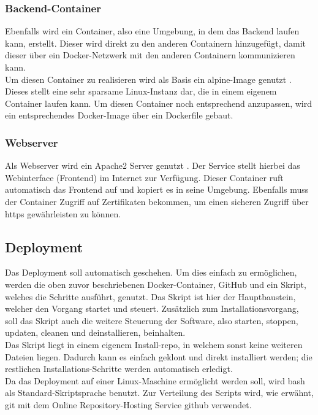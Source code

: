 		\subsubsection{Backend-Container}
		
		Ebenfalls wird ein Container, also eine Umgebung, in dem das Backend laufen kann, erstellt. Dieser wird direkt zu den anderen Containern hinzugefügt, damit dieser über ein Docker-Netzwerk mit den anderen Containern kommunizieren kann.~\\
		Um diesen Container zu realisieren wird als Basis ein alpine-Image genutzt \cite{alpine}. Dieses stellt eine sehr sparsame Linux-Instanz dar, die in einem eigenem Container laufen kann. Um diesen Container noch entsprechend anzupassen, wird ein entsprechendes Docker-Image über ein Dockerfile gebaut.
		
		\subsubsection{Webserver}
		
		Als Webserver wird ein Apache2 Server genutzt \cite{apache}. Der Service stellt hierbei das Webinterface (Frontend) im Internet zur Verfügung. Dieser Container ruft automatisch das Frontend auf und kopiert es in seine Umgebung. Ebenfalls muss der Container Zugriff auf Zertifikaten bekommen, um einen sicheren Zugriff über \gls{https} gewährleisten zu können.
				
	\subsection{Deployment}
	
	Das Deployment soll automatisch geschehen. Um dies einfach zu ermöglichen, werden die oben zuvor beschriebenen Docker-Container, GitHub und ein Skript, welches die Schritte ausführt, genutzt. Das Skript ist hier der Hauptbaustein, welcher den Vorgang startet und steuert. Zusätzlich zum Installationsvorgang, soll das Skript auch die weitere Steuerung der Software, also starten, stoppen, updaten, cleanen und deinstallieren, beinhalten.~\\
	Das Skript liegt in einem eigenem Install-\Gls{repo}, in welchem sonst keine weiteren Dateien liegen. Dadurch kann es einfach geklont und direkt installiert werden; die restlichen Installations-Schritte werden automatisch erledigt.~\\
	Da das Deployment auf einer Linux-Maschine ermöglicht werden soll, wird \Gls{bash} als Standard-Skriptsprache benutzt. Zur Verteilung des Scripts wird, wie erwähnt, \Gls{git} mit dem Online Repository-Hosting Service \Gls{github} verwendet.
